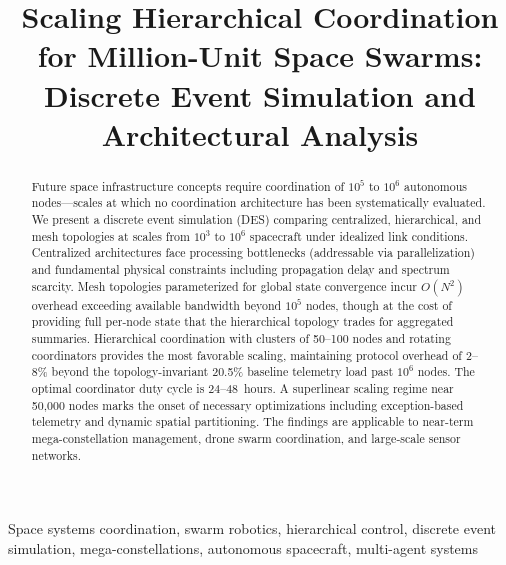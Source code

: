 \documentclass[journal]{IEEEtran}
\begin{document}
\title{Scaling Hierarchical Coordination for Million-Unit Space Swarms: Discrete Event Simulation and Architectural Analysis}

\author{
}


\maketitle

\begin{abstract}
Future space infrastructure concepts require coordination of $10^5$ to $10^6$ autonomous nodes---scales at which no coordination architecture has been systematically evaluated. We present a discrete event simulation (DES) comparing centralized, hierarchical, and mesh topologies at scales from $10^3$ to $10^6$ spacecraft under idealized link conditions. Centralized architectures face processing bottlenecks (addressable via parallelization) and fundamental physical constraints including propagation delay and spectrum scarcity. Mesh topologies parameterized for global state convergence incur $O(N^2)$ overhead exceeding available bandwidth beyond $10^5$ nodes, though at the cost of providing full per-node state that the hierarchical topology trades for aggregated summaries. Hierarchical coordination with clusters of 50--100 nodes and rotating coordinators provides the most favorable scaling, maintaining protocol overhead of 2--8\% beyond the topology-invariant 20.5\% baseline telemetry load past $10^6$ nodes. The optimal coordinator duty cycle is 24--48~hours. A superlinear scaling regime near 50{,}000 nodes marks the onset of necessary optimizations including exception-based telemetry and dynamic spatial partitioning. The findings are applicable to near-term mega-constellation management, drone swarm coordination, and large-scale sensor networks.
\end{abstract}

\begin{IEEEkeywords}
Space systems coordination, swarm robotics, hierarchical control, discrete event simulation, mega-constellations, autonomous spacecraft, multi-agent systems
\end{IEEEkeywords}
\end{document}
